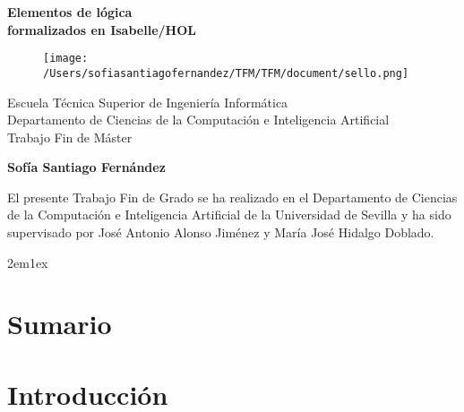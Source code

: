 \documentclass[12pt,a4paper,twoside]{book}
\begin{document}
\begin{titlepage}
 \vspace*{2cm}
  \begin{center}
    {\huge \textbf{Elementos de lógica \\ \vspace*{1em}
                   formalizados en Isabelle/HOL}}
  \end{center}
  \vspace{3cm}
  \begin{center}
    \begin{figure}[h]
    \centering
    \texttt{[image: /Users/sofiasantiagofernandez/TFM/TFM/document/sello.png]}
    \end{figure}
  \vspace{3cm}
    {\normalsize Escuela Técnica Superior de Ingeniería Informática} \\
    {\normalsize Departamento de Ciencias de la Computación e Inteligencia Artificial}\\
    {\normalsize Trabajo Fin de Máster} \\
  \end{center}
  \begin{center}
    {\large \textbf{Sofía Santiago Fernández}}
  \end{center}
\end{titlepage}

\newpage


El presente Trabajo Fin de Grado se ha realizado en el Departamento de
Ciencias de la Computación e Inteligencia Artificial de la Universidad
de Sevilla y ha sido supervisado por José Antonio Alonso Jiménez y María
José Hidalgo Doblado.

\newpage

\tableofcontents

\parindent 2em\parskip 1ex

% 
\chapter*{Sumario}

\chapter*{Introducción}

\end{document}
